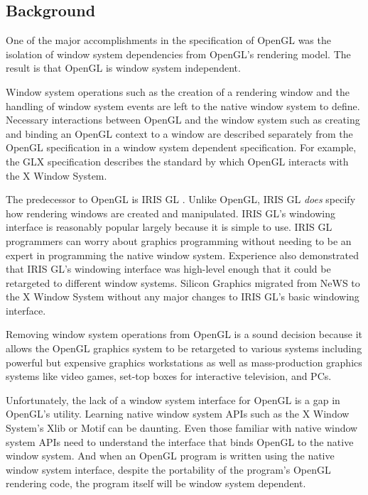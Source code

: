 \documentclass[titlepage,twoside]{article}
\begin{document}
\subsection{Background}

One of the major accomplishments in the specification of OpenGL
\cite{segal92,arb92} was the isolation of window system dependencies
from OpenGL's rendering model.  The result is that OpenGL is window
system independent.

Window system operations such as the creation of a rendering window and
the handling of window system events are left to the native window
system to define.  Necessary interactions between OpenGL and the window
system such as creating and binding an OpenGL context to a window are
described separately from the OpenGL specification in a window system
dependent specification.  For example, the GLX specification
\cite{karlton93} describes the standard by which OpenGL interacts with
the X Window System.

The predecessor to OpenGL is IRIS GL \cite{sgi91a,sgi91b}.  Unlike
OpenGL, IRIS GL {\em does} specify how rendering windows are created
and manipulated.  IRIS GL's windowing interface is reasonably popular
largely because it is simple to use.  IRIS GL programmers can worry
about graphics programming without needing to be an expert in
programming the native window system.  Experience also demonstrated that
IRIS GL's windowing interface was high-level enough that it could be
retargeted to different window systems.  Silicon Graphics migrated from
NeWS to the X Window System without any major changes to IRIS GL's
basic windowing interface.

Removing window system operations from OpenGL is a sound decision
because it allows the OpenGL graphics system to be retargeted to
various systems including powerful but expensive graphics workstations
as well as mass-production graphics systems like video games, set-top
boxes for interactive television, and PCs.

Unfortunately, the lack of a window system interface for OpenGL is a
gap in OpenGL's utility.  Learning native window system APIs such as
the X Window System's Xlib \cite{kilgard94a} or Motif \cite{kilgard94b}
can be daunting.  Even those familiar with native window system APIs
need to understand the interface that binds OpenGL to the native window
system.  And when an OpenGL program is written using the native window
system interface, despite the portability of the program's OpenGL
rendering code, the program itself will be window system dependent.
\end{document}
